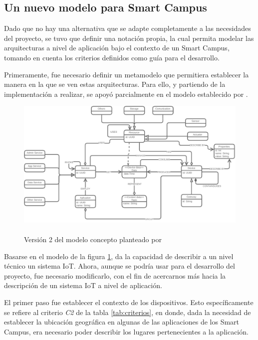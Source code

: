 \subsection{Un nuevo modelo para Smart Campus}

Dado que no hay una alternativa que se adapte completamente a las necesidades del proyecto, se tuvo que definir una notación propia, la cual permita modelar las arquitecturas a nivel de aplicación bajo el contexto de un Smart Campus, tomando en cuenta los criterios definidos como guía para el desarrollo.

Primeramente, fue necesario definir un metamodelo que permitiera establecer la manera en la que se ven estas arquitecturas. Para ello, y partiendo de la implementación a realizar, se apoyó parcialmente en el modelo establecido por . 

\begin{figure}[H]
    \centering
    \caption{\\Versión 2 del modelo concepto planteado por \protect\citeauthor{msc_henry_2022}}
    \label{fig:henrymodelo}
    \vspace{2mm}

    \includegraphics[width=\linewidth]{images/HenryModelo.pdf}
\end{figure}

Basarse en el modelo de la figura \ref{fig:henrymodelo}, da la capacidad de describir a un nivel técnico un sistema IoT. Ahora, aunque se podría usar para el desarrollo del proyecto, fue necesario modificarlo, con el fin de acercarnos más hacia la descripción de un sistema IoT a nivel de aplicación. 

El primer paso fue establecer el contexto de los dispositivos. Esto específicamente se refiere al criterio \textit{C2} de la tabla \ref{tab:criterios}, en donde, dada la necesidad de establecer la ubicación geográfica en algunas de las aplicaciones de los Smart Campus, era necesario poder describir los lugares pertenecientes a la aplicación.

